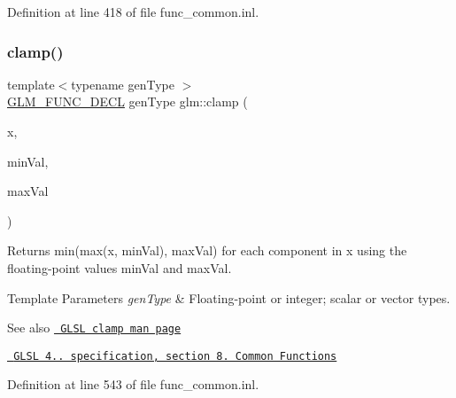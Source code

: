 Definition at line 418 of file func\+\_\+common.\+inl.

\mbox{\label{group__core__func__common_ga93bce26c7d80d30a62f5c508f8498a6c}} 
\subsubsection{\texorpdfstring{clamp()}{clamp()}\hspace{0.1cm}{\footnotesize\ttfamily [1/3]}}
{\footnotesize\ttfamily template$<$typename gen\+Type $>$ \\
\mbox{\hyperlink{setup_8hpp_ab2d052de21a70539923e9bcbf6e83a51}{G\+L\+M\+\_\+\+F\+U\+N\+C\+\_\+\+D\+E\+CL}} gen\+Type glm\+::clamp (\begin{DoxyParamCaption}\item[{gen\+Type}]{x,  }\item[{gen\+Type}]{min\+Val,  }\item[{gen\+Type}]{max\+Val }\end{DoxyParamCaption})}

Returns min(max(x, min\+Val), max\+Val) for each component in x using the floating-\/point values min\+Val and max\+Val.


\begin{DoxyTemplParams}{Template Parameters}
{\em gen\+Type} & Floating-\/point or integer; scalar or vector types.\\
\hline
\end{DoxyTemplParams}
\begin{DoxySeeAlso}{See also}
\href{http://www.opengl.org/sdk/docs/manglsl/xhtml/clamp.xml}{\texttt{ G\+L\+SL clamp man page}} 

\href{http://www.opengl.org/registry/doc/GLSLangSpec.4.20.8.pdf}{\texttt{ G\+L\+SL 4.. specification, section 8. Common Functions}} 
\end{DoxySeeAlso}


Definition at line 543 of file func\+\_\+common.\+inl.

\mbox{\label{group__core__func__common_gaf9deddb167a3055ca51cd9af3ce535f6}} 
